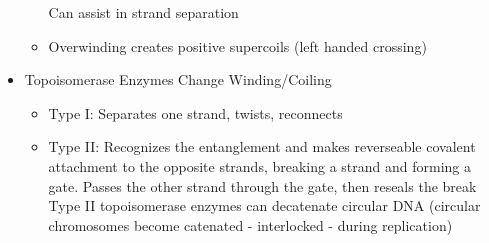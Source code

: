 \documentclass[12pt]{article}
\begin{document}
\begin{itemize}
\begin{itemize}
            Can assist in strand separation
            \item Overwinding creates positive supercoils (left handed crossing)
        \end{itemize}
        \item Topoisomerase Enzymes Change Winding/Coiling
        \begin{itemize}
            \item Type I: Separates one strand, twists, reconnects
            \item Type II: Recognizes the entanglement and makes reverseable covalent attachment to the opposite strands, breaking a strand and forming a gate. Passes the other strand through the gate, then reseals the break \\
            Type II topoisomerase enzymes can decatenate circular DNA (circular chromosomes become catenated - interlocked - during replication)
        \end{itemize}
    \end{itemize}
\end{document}
